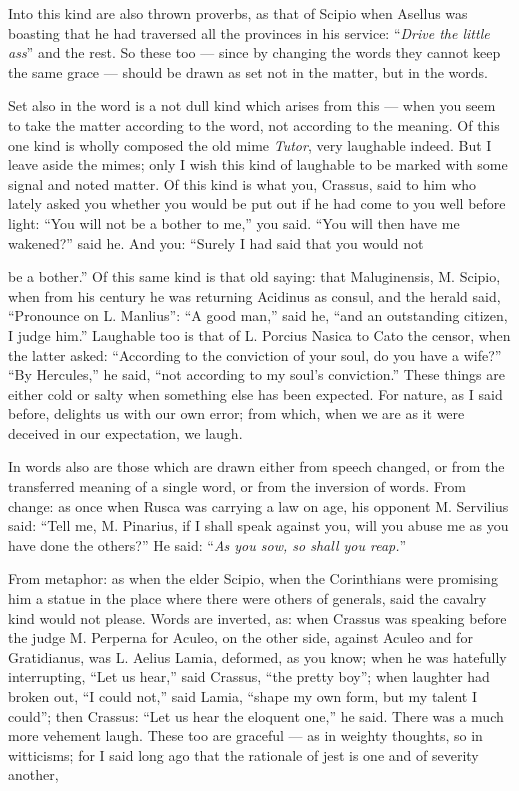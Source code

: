  Into this kind are also thrown proverbs, as that of Scipio when Asellus was boasting that he had traversed all the provinces in his service: ``\textit{Drive the little ass}'' and the rest. So these too — since by changing the words they cannot keep the same grace — should be drawn as set not in the matter, but in the words.

 Set also in the word is a not dull kind which arises from this — when you seem to take the matter according to the word, not according to the meaning. Of this one kind is wholly composed the old mime \textit{Tutor}, very laughable indeed. But I leave aside the mimes; only I wish this kind of laughable to be marked with some signal and noted matter. Of this kind is what you, Crassus, said to him who lately asked you whether you would be put out if he had come to you well before light: ``You will not be a bother to me,'' you said. ``You will then have me wakened?'' said he. And you: ``Surely I had said that you would not

 be a bother.'' Of this same kind is that old saying: that Maluginensis, M. Scipio, when from his century he was returning Acidinus as consul, and the herald said, ``Pronounce on L. Manlius'': ``A good man,'' said he, ``and an outstanding citizen, I judge him.'' Laughable too is that of L. Porcius Nasica to Cato the censor, when the latter asked: ``According to the conviction of your soul, do you have a wife?'' ``By Hercules,'' he said, ``not according to my soul's conviction.'' These things are either cold or salty when something else has been expected. For nature, as I said before, delights us with our own error; from which, when we are as it were deceived in our expectation, we laugh.

 In words also are those which are drawn either from speech changed, or from the transferred meaning of a single word, or from the inversion of words. From change: as once when Rusca was carrying a law on age, his opponent M. Servilius said: ``Tell me, M. Pinarius, if I shall speak against you, will you abuse me as you have done the others?'' He said: ``\textit{As you sow, so shall you reap.}''

 From metaphor: as when the elder Scipio, when the Corinthians were promising him a statue in the place where there were others of generals, said the cavalry kind would not please. Words are inverted, as: when Crassus was speaking before the judge M. Perperna for Aculeo, on the other side, against Aculeo and for Gratidianus, was L. Aelius Lamia, deformed, as you know; when he was hatefully interrupting, ``Let us hear,'' said Crassus, ``the pretty boy''; when laughter had broken out, ``I could not,'' said Lamia, ``shape my own form, but my talent I could''; then Crassus: ``Let us hear the eloquent one,'' he said. There was a much more vehement laugh. These too are graceful — as in weighty thoughts, so in witticisms; for I said long ago that the rationale of jest is one and of severity another,

